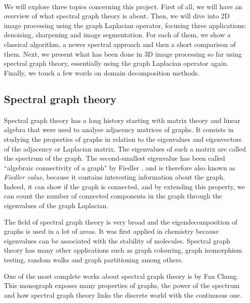 \paragraph{}
We will explore three topics concerning this project.
First of all, we will have an overview of what spectral graph theory is about.
Then, we will dive into 2D image processing using the graph Laplacian operator, focusing three applications: denoising, sharpening and image segmentation.
For each of them, we show a classical algorithm, a newer spectral approach and then a short comparison of them.
Next, we present what has been done in 3D image processing so far using spectral graph theory, essentially using the graph Laplacian operator again.
Finally, we touch a few words on domain decomposition methods.

\subsection{Spectral graph theory}

\paragraph{}
Spectral graph theory has a long history starting with matrix theory and linear algebra that were used to analyse adjacency matrices of graphs.
It consists in studying the properties of graphs in relation to the eigenvalues and eigenvectors of the adjacency or Laplacian matrix.
The eigenvalues of such a matrix are called the spectrum of the graph.
The second-smallest eigenvalue has been called ``algebraic connectivity of a graph" by Fiedler \cite{fiedler_algebraic_1973}, and is therefore also known as \textit{Fiedler value}, because it contains interesting information about the graph.
Indeed, it can show if the graph is connected, and by extending this property, we can count the number of connected components in the graph through the eigenvalues of the graph Laplacian.

The field of spectral graph theory is very broad and the eigendecomposition of graphs is used in a lot of areas.
It was first applied in chemistry because eigenvalues can be associated with the stability of molecules.
Spectral graph theory has many other applications such as graph colouring, graph isomorphism testing, random walks and graph partitioning among others.

One of the most complete works about spectral graph theory is \cite{chung_spectral_1997} by Fan Chung.
This monograph exposes many properties of graphs, the power of the spectrum and how spectral graph theory links the discrete world with the continuous one.

